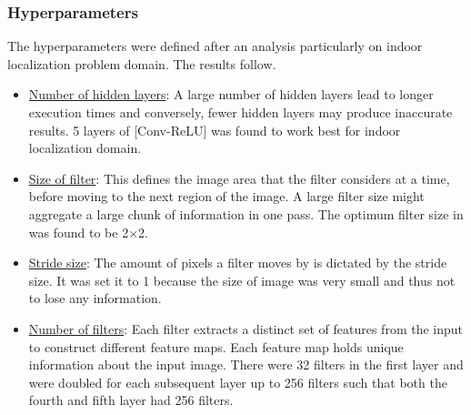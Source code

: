     \subsubsection{Hyperparameters}
    The hyperparameters were defined after an analysis particularly on indoor localization problem domain. The results follow.
        \begin{itemize}
            \item \underline{Number of hidden layers}: A large number of hidden layers lead to longer execution times and conversely, fewer hidden layers may produce inaccurate results. 5 layers of [Conv-ReLU] was found to work best for indoor localization domain.
            \item \underline{Size of filter}: This defines the image area that the filter considers at a time, before moving to the next region of the image. A large filter size might aggregate a large chunk of information in one pass. The optimum filter size in was found to be 2×2.
            \item \underline{Stride size}: The amount of pixels a filter moves by is dictated by the stride size. It was set it to 1 because the size of image was very small and thus not to lose any information.
            \item \underline{Number of filters}: Each filter extracts a distinct set of features from the input to construct different feature maps. Each feature map holds unique information about the input image. There were 32 filters in the first layer and were doubled for each subsequent layer up to 256 filters such that both the fourth and fifth layer had 256 filters.
        \end{itemize}

